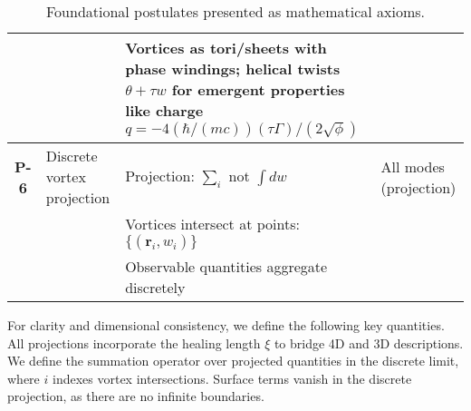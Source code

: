 \begin{table}[H]
\begin{tabularx}{\textwidth}{|c|Y|Y|Y|}
& & Vortices as tori/sheets with phase windings; helical twists $\theta + \tau w$ for emergent properties like charge $q = -4 (\hbar / (m c)) (\tau \Gamma) / (2 \sqrt{\phi})$ &  \\
\hline
\textbf{P-6} & Discrete vortex projection & Projection: $\sum_i$ not $\int dw$ & All modes (projection) \\
& & Vortices intersect at points: $\{(\mathbf{r}_i, w_i)\}$ &  \\
& & Observable quantities aggregate discretely &  \\
\hline
\end{tabularx}
\caption{Foundational postulates presented as mathematical axioms.}
\label{tab:postulates}
\end{table}

For clarity and dimensional consistency, we define the following key quantities. All projections incorporate the healing length $\xi$ to bridge 4D and 3D descriptions. We define the summation operator over projected quantities in the discrete limit, where $i$ indexes vortex intersections. Surface terms vanish in the discrete projection, as there are no infinite boundaries.

